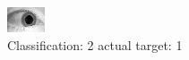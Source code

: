 \begin{figure}[h!]
\begin{center}
\includegraphics[width=0.60\columnwidth]{figures/ID1570_class_2_target_1.png}
\end{center}
\caption{ Classification: 2 actual target: 1}
\label{fig:ID1570_class_2_target_1}
\end{figure}
